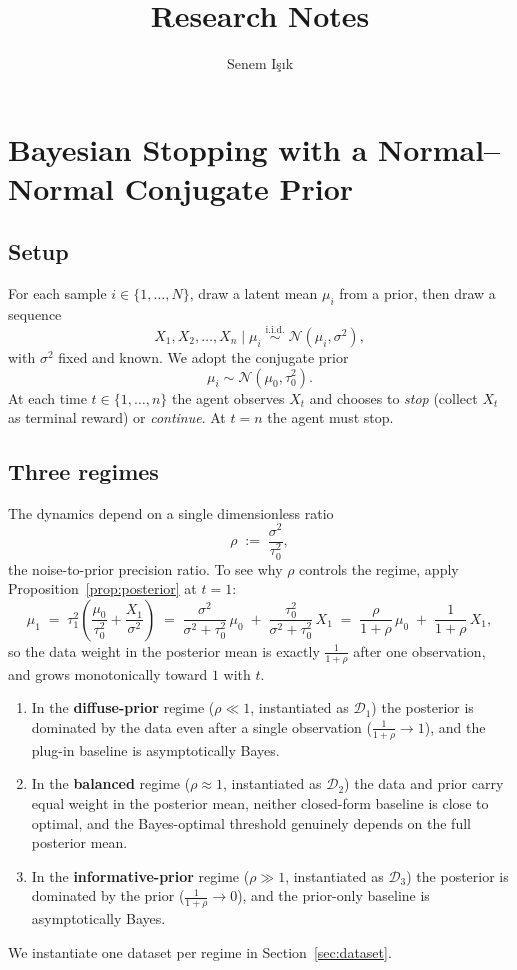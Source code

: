 \documentclass[11pt]{article}
\title{Research Notes}
\author{Senem I\c{s}\i{}k}
\begin{document}
\maketitle

\section{Bayesian Stopping with a Normal--Normal Conjugate Prior}

\subsection{Setup}

For each sample $i \in \{1,\ldots,N\}$, draw a latent mean $\mu_i$ from a prior, then draw a sequence
\[
X_1, X_2, \ldots, X_n \mid \mu_i \;\overset{\text{i.i.d.}}{\sim}\; \mathcal{N}(\mu_i, \sigma^2),
\]
with $\sigma^2$ fixed and known. We adopt the conjugate prior
\[
\mu_i \sim \mathcal{N}(\mu_0, \tau_0^2).
\]
At each time $t \in \{1,\ldots,n\}$ the agent observes $X_t$ and chooses to \emph{stop} (collect $X_t$ as terminal reward) or \emph{continue}. At $t = n$ the agent must stop.

\subsection{Three regimes}
\label{sec:regimes}

The dynamics depend on a single dimensionless ratio
\[
\rho \;:=\; \frac{\sigma^2}{\tau_0^2},
\]
the noise-to-prior precision ratio. To see why $\rho$ controls the regime, apply Proposition~\ref{prop:posterior} at $t = 1$:
\[
\mu_1
\;=\; \tau_1^2 \!\left(\frac{\mu_0}{\tau_0^2} + \frac{X_1}{\sigma^2}\right)
\;=\; \frac{\sigma^2}{\sigma^2 + \tau_0^2}\,\mu_0 \;+\; \frac{\tau_0^2}{\sigma^2 + \tau_0^2}\,X_1
\;=\; \frac{\rho}{1+\rho}\,\mu_0 \;+\; \frac{1}{1+\rho}\,X_1,
\]
so the data weight in the posterior mean is exactly $\frac{1}{1+\rho}$ after one observation, and grows monotonically toward $1$ with $t$.
\begin{enumerate}
    \item In the \textbf{diffuse-prior} regime ($\rho \ll 1$, instantiated as $\mathcal{D}_1$) the posterior is dominated by the data even after a single observation ($\frac{1}{1+\rho} \to 1$), and the plug-in baseline is asymptotically Bayes.
    \item In the \textbf{balanced} regime ($\rho \approx 1$, instantiated as $\mathcal{D}_2$) the data and prior carry equal weight in the posterior mean, neither closed-form baseline is close to optimal, and the Bayes-optimal threshold genuinely depends on the full posterior mean.
     \item In the \textbf{informative-prior} regime ($\rho \gg 1$, instantiated as $\mathcal{D}_3$) the posterior is dominated by the prior ($\frac{1}{1+\rho} \to 0$), and the prior-only baseline is asymptotically Bayes.
\end{enumerate}
We instantiate one dataset per regime in Section~\ref{sec:dataset}.
\end{document}
